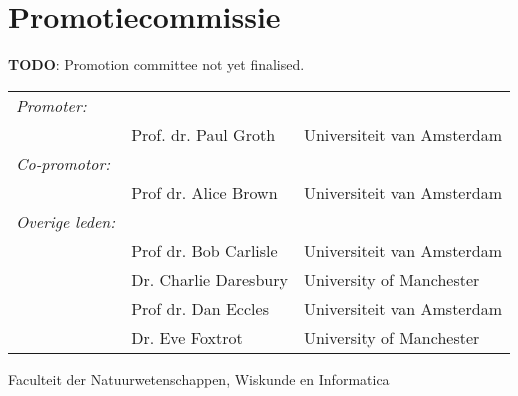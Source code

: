 \newpage

\section*{Promotiecommissie}

\textbf{TODO}: Promotion committee not yet finalised.

\begin{tabular}{lll}
\textit{Promoter:}  &  & \\
     & Prof. dr. Paul Groth     & Universiteit van Amsterdam \\
\textit{Co-promotor:} & & \\     
     &  Prof dr. Alice Brown    & Universiteit van Amsterdam \\
\textit{Overige leden:} & & \\
     &  Prof dr. Bob Carlisle   & Universiteit van Amsterdam \\
     &  Dr. Charlie Daresbury   & University of Manchester  \\     
     &  Prof dr. Dan Eccles     & Universiteit van Amsterdam \\
     &  Dr. Eve Foxtrot         & University of Manchester  \\     
\end{tabular}

Faculteit der Natuurwetenschappen, Wiskunde en Informatica
